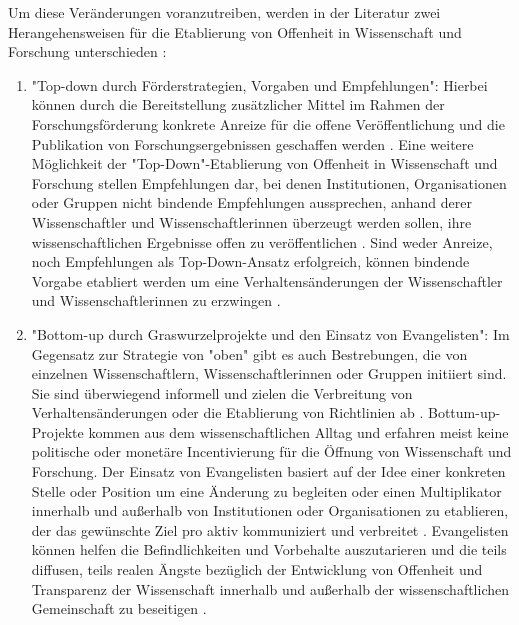 Um diese Veränderungen voranzutreiben, werden in der Literatur zwei Herangehensweisen für die Etablierung von Offenheit in Wissenschaft und Forschung unterschieden \cite{schulze_2013_open}:
\begin{enumerate}
\item "Top-down durch Förderstrategien, Vorgaben und Empfehlungen": Hierbei können durch die Bereitstellung zusätzlicher Mittel im Rahmen der Forschungsförderung konkrete Anreize für die offene Veröffentlichung und die Publikation von Forschungsergebnissen geschaffen werden \cite{suchen}. Eine weitere Möglichkeit der "Top-Down"-Etablierung von Offenheit in Wissenschaft und Forschung stellen Empfehlungen dar, bei denen Institutionen, Organisationen oder Gruppen nicht bindende Empfehlungen aussprechen, anhand derer Wissenschaftler und Wissenschaftlerinnen überzeugt werden sollen, ihre wissenschaftlichen Ergebnisse offen zu veröffentlichen \cite{suchen}. Sind weder Anreize, noch Empfehlungen als Top-Down-Ansatz erfolgreich, können bindende Vorgabe etabliert werden um eine Verhaltensänderungen der Wissenschaftler und Wissenschaftlerinnen zu erzwingen \cite{suchen}.
\item "Bottom-up durch Graswurzelprojekte und den Einsatz von Evangelisten":
Im Gegensatz zur Strategie von "oben" gibt es auch Bestrebungen, die von einzelnen Wissenschaftlern, Wissenschaftlerinnen oder Gruppen initiiert sind. Sie sind überwiegend informell und zielen die Verbreitung von Verhaltensänderungen oder die Etablierung von Richtlinien ab \cite{suchen}. Bottum-up-Projekte kommen aus dem wissenschaftlichen Alltag und erfahren meist keine politische oder monetäre Incentivierung für die Öffnung von Wissenschaft und Forschung. Der Einsatz von Evangelisten basiert auf der Idee einer konkreten Stelle oder Position um eine Änderung zu begleiten \cite{suchen} oder einen Multiplikator innerhalb und außerhalb von Institutionen oder Organisationen zu etablieren, der das gewünschte Ziel pro aktiv kommuniziert und verbreitet \cite{suchen}. Evangelisten können helfen die Befindlichkeiten und Vorbehalte auszutarieren und die teils diffusen, teils realen Ängste bezüglich der Entwicklung von Offenheit und Transparenz der Wissenschaft innerhalb und außerhalb der wissenschaftlichen Gemeinschaft zu beseitigen \cite{schulze_2013_open}.
\end{enumerate}

